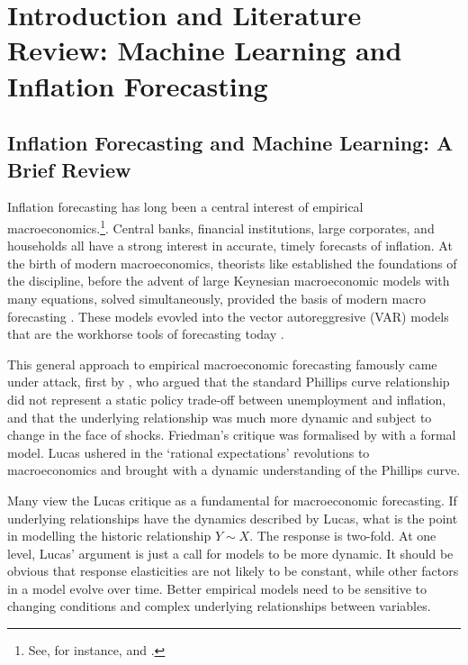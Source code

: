 \pagebreak
\section{Introduction and Literature Review: Machine Learning and Inflation Forecasting} \label{sec:lit}

\subsection{Inflation Forecasting and Machine Learning: A Brief Review} \label{sec:lit_review}

Inflation forecasting has long been a central interest of empirical macroeconomics.\footnote{See, for instance, \textcite{Gordon1990U.S.Unemployment} and \textcite{Stock1999ForecastingInflation}.}. Central banks, financial institutions, large corporates, and households all have a strong interest in accurate, timely forecasts of inflation. At the birth of modern macroeconomics, theorists like \textcite{Tinter1940Business1919-1932} established the foundations of the discipline, before the advent of large Keynesian macroeconomic models with many equations, solved simultaneously, provided the basis of modern macro forecasting \autocite{Ekeblad1952Economic1921-1941.}. These models evovled into the vector autoreggresive (VAR) models that are the workhorse tools of forecasting today \autocite{Sims1982PolicyModels}.

This general approach to empirical macroeconomic forecasting famously came under attack, first by \textcite{Friedman1968ThePolicy}, who argued that the standard Phillips curve relationship \autocite{Phillips1958The186119571} did not represent a static policy trade-off between unemployment and inflation, and that the underlying relationship was much more dynamic and subject to change in the face of shocks. Friedman's critique was formalised by \textcite{Lucas1976EconometricCritique} with a formal model. Lucas ushered in the `rational expectations' revolutions to macroeconomics and brought with a dynamic understanding of the Phillips curve. 

Many view the Lucas critique as a fundamental for macroeconomic forecasting. If underlying relationships have the dynamics described by Lucas, what is the point in modelling the historic relationship $Y \sim X $. The response is two-fold. At one level, Lucas' argument is just a call for models to be more dynamic. It should be obvious that response elasticities are not likely to be constant, while other factors in a model evolve over time. Better empirical models need to be sensitive to changing conditions and complex underlying relationships between variables.  


